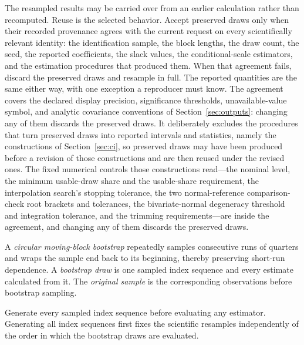 \documentclass[11pt]{article}
\begin{document}
The resampled results may be carried over from an earlier calculation rather than recomputed. Reuse
is the selected behavior. Accept preserved draws only when their recorded provenance agrees with
the current request on every scientifically relevant identity: the identification sample, the block
lengths, the draw count, the seed, the reported coefficients, the slack values, the conditional-scale
estimators, and the estimation procedures that produced them. When that
agreement fails, discard the preserved draws and resample in full. The reported quantities are the
same either way, with one exception a reproducer must know. The agreement covers the declared display
precision, significance thresholds, unavailable-value symbol, and analytic covariance conventions of
Section~\ref{sec:outputs}: changing any of them discards the preserved draws. It deliberately
excludes the procedures that turn preserved draws into reported intervals and statistics, namely the
constructions of Section~\ref{sec:ci}, so preserved draws may have been produced before a revision of
those constructions and are then reused under the revised ones. The fixed numerical controls those
constructions read---the nominal level, the minimum usable-draw share and the usable-share
requirement, the interpolation search's stopping tolerance, the two normal-reference comparison-check root
brackets and tolerances, the bivariate-normal degeneracy threshold and integration tolerance, and
the trimming requirements---are inside the agreement, and changing any of them discards the
preserved draws.

A \emph{circular moving-block bootstrap} repeatedly samples
consecutive runs of quarters and wraps the sample end back to its beginning, thereby preserving
short-run dependence. A \emph{bootstrap draw} is one sampled index sequence and every estimate
calculated from it. The \emph{original sample} is the corresponding observations before bootstrap sampling.

Generate every sampled index sequence before evaluating any estimator. Generating all index
sequences first fixes the scientific resamples independently of the order in which the bootstrap
draws are evaluated.
\end{document}
